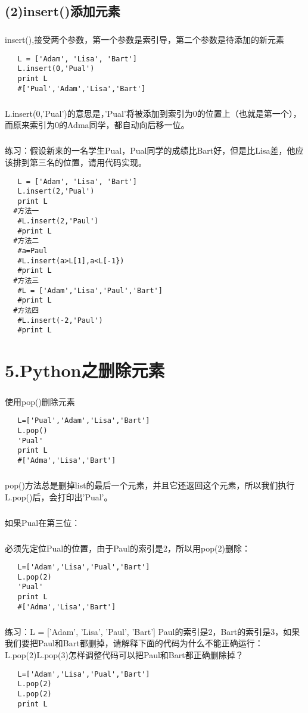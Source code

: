 \documentclass{article}
\begin{document}
\begin{CJK}{UTF8}{gbsn}
\subsection*{(2)insert()添加元素}
\subparagraph*{}
insert(),接受两个参数，第一个参数是索引导，第二个参数是待添加的新元素
\begin{verbatim}
   L = ['Adam', 'Lisa', 'Bart']
   L.insert(0,'Pual')
   print L
   #['Pual','Adam','Lisa','Bart']
\end{verbatim}
\subparagraph*{}
L.insert(0,'Pual')的意思是，'Pual'将被添加到索引为0的位置上（也就是第一个），而原来索引为0的Adma同学，都自动向后移一位。
\subparagraph*{}
练习：假设新来的一名学生Pual，Pual同学的成绩比Bart好，但是比Lisa差，他应该排到第三名的位置，请用代码实现。
\begin{verbatim}
   L = ['Adam', 'Lisa', 'Bart']
   L.insert(2,'Pual')
   print L
  #方法一
   #L.insert(2,'Paul')    
   #print L
  #方法二
   #a=Paul
   #L.insert(a>L[1],a<L[-1})
   #print L
  #方法三
   #L = ['Adam','Lisa','Paul','Bart']
   #print L
  #方法四
   #L.insert(-2,'Paul')
   #print L
\end{verbatim}
\section*{5.Python之删除元素}
\subparagraph*{}
使用pop()删除元素
\begin{verbatim}
   L=['Pual','Adam','Lisa','Bart']
   L.pop()
   'Pual'
   print L
   #['Adma','Lisa','Bart']
\end{verbatim}
\subparagraph*{}
pop()方法总是删掉list的最后一个元素，并且它还返回这个元素，所以我们执行L.pop()后，会打印出'Pual'。
\subparagraph*{}
如果Pual在第三位：
\subparagraph*{}
必须先定位Pual的位置，由于Paul的索引是2，所以用pop(2)删除：
\begin{verbatim}
   L=['Adam','Lisa','Pual','Bart']
   L.pop(2)
   'Pual'
   print L
   #['Adma','Lisa','Bart']
\end{verbatim}
\subparagraph*{}
练习：L = ['Adam', 'Lisa', 'Paul', 'Bart']
Paul的索引是2，Bart的索引是3，如果我们要把Paul和Bart都删掉，请解释下面的代码为什么不能正确运行：
L.pop(2)L.pop(3)怎样调整代码可以把Paul和Bart都正确删除掉？
\begin{verbatim}
   L=['Adam','Lisa','Pual','Bart']
   L.pop(2)
   L.pop(2)
   print L
\end{verbatim}

\end{CJK}
\end{document}

